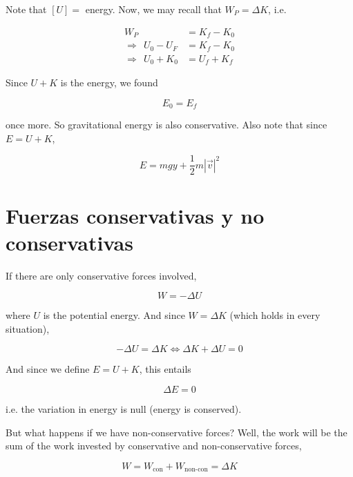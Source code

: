 \documentclass[12pt]{article}
\theoremstyle{definition}
\begin{document}
Note that $\left[ U \right] = $ energy. Now, we may recall that $W_P = \Delta
K$, i.e. 

\begin{align*}
    W_P 
    &= K_f - K_0  \\ 
   \Rightarrow ~ ~ U_0 - U_F &= K_f - K_0 \\ 
   \Rightarrow ~ ~ U_0 + K_0 &= U_f + K_f
\end{align*}

Since $U + K$ is the energy, we found 

\begin{equation}
    E_0 = E_f
\end{equation}

once more. So gravitational energy is also conservative. Also note that since $E
= U + K$,

\begin{equation}
    E = mgy + \frac{1}{2}m \left| \vec{v} \right|^2
\end{equation}

\section{Fuerzas conservativas y no conservativas}

If there are only conservative forces involved, 

\begin{equation*}
    W = - \Delta U
\end{equation*}

where $U$ is the potential energy. And since $W = \Delta K$ (which holds in
every situation),

\begin{equation*}
    - \Delta U = \Delta K \iff \Delta K + \Delta U = 0
\end{equation*}

And since we define $E = U + K$, this entails 

\begin{equation*}
    \Delta E = 0
\end{equation*}

i.e. the variation in energy is null (energy is conserved).


But what happens if we have non-conservative forces? Well, the work will be the
sum of the work invested by conservative and non-conservative forces, 

\begin{equation*}
    W = W_{\text{con}} + W_{\text{non-con}} = \Delta K
\end{equation*}
\end{document}
